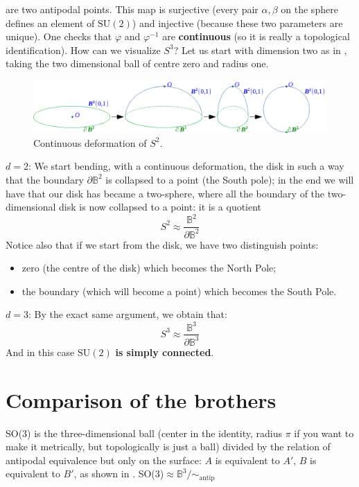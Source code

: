 \documentclass[../main.tex]{subfiles}
\begin{document}
are two antipodal points. This map is surjective (every pair $\alpha,\beta$ on the sphere defines an element of $\textrm{SU}(2)$) and injective (because these two parameters are unique). One checks that $\varphi$ and $\varphi^{-1}$ are \textbf{continuous} (so it is really a topological identification). How can we visualize $S^3$? Let us start with dimension two as in , taking the two dimensional ball of centre zero and radius one.
\begin{figure}[h]
    \centering
    \includegraphics{images/visualization.pdf}
    \caption{Continuous deformation of $S^2$.}
\end{figure}

\underline{$d=2$}: We start bending, with a continuous deformation, the disk in such a way that the boundary $\partial\mathbb{B}^2$ is collapsed to a point (the South pole); in the end we will have that our disk has became a two-sphere, where all the boundary of the two-dimensional disk is now collapsed to a point: it is a quotient \[
S^2\approx\frac{\mathbb{B}^2}{\partial\mathbb{B}^2}
\]
Notice also that if we start from the disk, we have two distinguish points:
\begin{itemize}
    \item zero (the centre of the disk) which becomes the North Pole;
    \item the boundary (which will become a point) which becomes the South Pole.
\end{itemize}
\underline{$d=3$}: By the exact same argument, we obtain that: 
\[
S^3\approx\frac{\mathbb{B}^3}{\partial\mathbb{B}^3}
\]
And in this case $\textrm{SU}(2)$\textbf{ is simply connected}. 
\section{Comparison of the brothers}
SO(3) is the three-dimensional ball (center in the identity, radius $\pi$ if you want to make it metrically, but topologically is just a ball) divided by the relation of antipodal equivalence but only on the surface: $A$ is equivalent to $A'$, $B$ is equivalent to $B'$, as shown in . SO(3)$\approx\mathbb{B}^3\slash\sim_{\textrm{antip}}$
\end{document}
